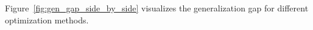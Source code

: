 \documentclass{article} %
\begin{document}

Figure~\ref{fig:gen_gap_side_by_side} visualizes the generalization gap for different optimization methods.
\end{document}
